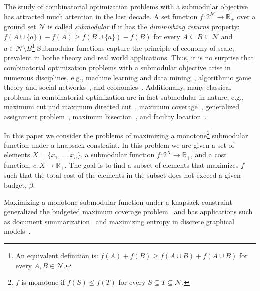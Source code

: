 The study of combinatorial optimization problems with a submodular objective has attracted much attention in the last decade. 
A set function $f:2^\mathcal{N} \to \mathbb{R}_+$ over a ground set $\mathcal{N}$ is called \emph{submodular} if it has the \emph{diminishing returns} property:
$f(A \cup \{a\}) - f(A) \geq f(B \cup \{a\}) - f(B)$ for every $A \subseteq B \subseteq \mathcal{N}$ and $a \in \mathcal{N} \setminus B$\footnote{
    An equivalent definition is: $f(A) + f(B) \geq f(A \cup B) + f(A \cup B)$ for every $A,B \in \mathcal{N}$.
}
Submodular functions capture the principle of economy of scale, prevalent in bothe theory and real world applications.
Thus, it is no surprise that combinatorial optimization problems with a submodular objective arise in numerous disciplines, e.g., machine learning and data mining~\cite{bach2013learning,bordeaux2014tractability}, algorithmic game theory and social networks~\cite{dughmi2009revenue,hartline2008optimal,he2015stability,kempe2003maximizing,schulz2013approximating}, and economics~\cite{ahmed2011maximizing}.
Additionally, many classical problems in combinatorial optimization are in fact submodular in nature, e.g., maximum cut and maximum directed cut~\cite{goemans1995improved,Halperin:2001:CAA:365411.365412,Hastad:2001:OIR:502090.502098,Karp1972,Khot05optimalinapproximability}, maximum coverage~\cite{Feige:1998:TLN:285055.285059,KHULLER199939}, generalized assignment problem~\cite{Chekuri06apolynomial,Cohen06anefficient,Feige2006ApproximationAF,Fleischer:2006:TAA:1109557.1109624}, maximum bisection~\cite{DBLP:journals/talg/AustrinBG16,DBLP:journals/algorithmica/FriezeJ97}, and facility location~\cite{DBLP:journals/dam/AgeevS99,CORNUEJOLS1977163,doi:10.1287/mnsc.23.8.789}.

In this paper we consider the problems of maximizing a monotone\footnote{
    $f$ is monotone if $f(S) \leq f(T)$ for every $S \subseteq T \subseteq \mathcal{N}$.
} submodular function under a knapsack constraint.
In this problem we are given a set of elements
$X = \{x_1, \dots, x_n\}$, a submodular function $f:2^X \to \mathbb{R}_+$, and a cost function, $c:X \to \mathbb{R}_+$.
The goal is to find a subset of elements that maximizes $f$ such that the total cost of the elements in the subset does not exceed a given budget, 
$\beta$.

Maximizing a monotone submodular function under a knapsack constraint generalized the budgeted maximum coverage problem~\cite{khuller1999budgeted} and has applications such as document summarization~\cite{lin2010multi} and maximizing entropy in discrete graphical models~\cite{krause2005note}.


